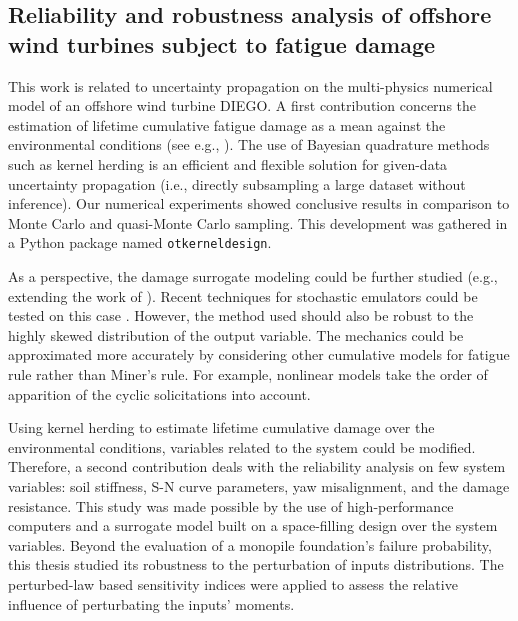 \subsection*{Reliability and robustness analysis of offshore wind turbines subject to fatigue damage}

This work is related to uncertainty propagation on the multi-physics numerical model of an offshore wind turbine DIEGO. 
A first contribution concerns the estimation of lifetime cumulative fatigue damage as a mean against the environmental conditions (see e.g., \citealp{muller_cheng_2018}). 
The use of Bayesian quadrature methods such as kernel herding \citep{chen_welling_2010,husar_duvenaud_2012} is an efficient and flexible solution for given-data uncertainty propagation (i.e., directly subsampling a large dataset without inference). 
Our numerical experiments showed conclusive results in comparison to Monte Carlo and quasi-Monte Carlo sampling. 
This development was gathered in a Python package named \texttt{otkerneldesign}. 

As a perspective, the damage surrogate modeling could be further studied (e.g., extending the work of \citealp{slot_sorensen_2020}). 
Recent techniques for stochastic emulators could be tested on this case \citep{baker_2022_stochastic_surrogates_review,zhu_2023_stochastic_pce,luthen_2023_stochastic_pce}.
However, the method used should also be robust to the highly skewed distribution of the output variable. 
The mechanics could be approximated more accurately by considering other cumulative models for fatigue rule rather than Miner's rule. 
For example, nonlinear models \citep{rocher_2020_nonlinear_fatigue} take the order of apparition of the cyclic solicitations into account.  

Using kernel herding to estimate lifetime cumulative damage over the environmental conditions, variables related to the system could be modified. 
Therefore, a second contribution deals with the reliability analysis on few system variables: soil stiffness, S-N curve parameters, yaw misalignment, and the damage resistance.   
This study was made possible by the use of high-performance computers and a surrogate model built on a space-filling design over the system variables. 
Beyond the evaluation of a monopile foundation's failure probability, this thesis studied its robustness to the perturbation of inputs distributions.  
The perturbed-law based sensitivity indices \citep{lemaitre_2015_PLI} were applied to assess the relative influence of perturbating the inputs' moments. 

